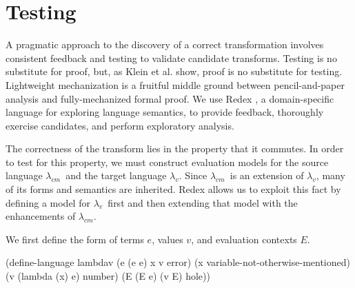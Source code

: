 \documentclass{llncs}
\newcommand{\cm}[0]{$\lambda_{cm}$}
\newcommand{\lv}[0]{$\lambda_v$}
\begin{document}

\section{Testing}

A pragmatic approach to the discovery of a correct transformation involves consistent feedback and testing to validate candidate transforms. Testing is no substitute for proof, but, as Klein et al. \cite{klein2012run} show, proof is no substitute for testing. Lightweight mechanization is a fruitful middle ground between pencil-and-paper analysis and fully-mechanized formal proof. We use Redex \cite{findler2010redex}, a domain-specific language for exploring language semantics, to provide feedback, thoroughly exercise candidates, and perform exploratory analysis.

The correctness of the transform lies in the property that it commutes. In order to test for this property, we must construct evaluation models for the source language \cm\ and the target language \lv. Since \cm\ is an extension of \lv, many of its forms and semantics are inherited. Redex allows us to exploit this fact by defining a model for \lv\ first and then extending that model with the enhancements of \cm.


\setspecialsymbol{->}{$\to$}
\setspecialsymbol{-->}{$\rightarrow$}


We first define the form of terms $e$, values $v$, and evaluation contexts $E$.

\begin{schemedisplay}
(define-language lambdav
  (e (e e) x v error)
  (x variable-not-otherwise-mentioned)
  (v (lambda (x) e) number)
  (E (E e) (v E) hole))
\end{schemedisplay}
\end{document}
